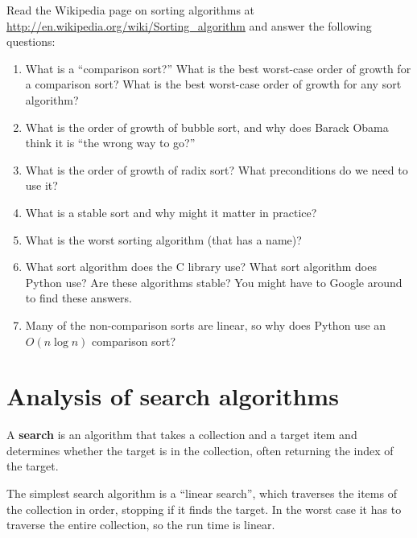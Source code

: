 \documentclass[10pt]{book}
\begin{document}
\begin{exercise}

Read the Wikipedia page on sorting algorithms at
\url{http://en.wikipedia.org/wiki/Sorting_algorithm} and answer
the following questions:

\begin{enumerate}

\item What is a ``comparison sort?'' What is the best worst-case order
  of growth for a comparison sort?  What is the best worst-case order
  of growth for any sort algorithm?

\item What is the order of growth of bubble sort, and why does Barack
  Obama think it is ``the wrong way to go?''

\item What is the order of growth of radix sort?  What preconditions
  do we need to use it?

\item What is a stable sort and why might it matter in practice?

\item What is the worst sorting algorithm (that has a name)?

\item What sort algorithm does the C library use?  What sort algorithm
  does Python use?  Are these algorithms stable?  You might have to
  Google around to find these answers.

\item Many of the non-comparison sorts are linear, so why does
  Python use an $O(n \log n)$ comparison sort?

\end{enumerate}

\end{exercise}


\section{Analysis of search algorithms}

A {\bf search} is an algorithm that takes a collection and a target
item and determines whether the target is in the collection, often
returning the index of the target.

The simplest search algorithm is a ``linear search'', which traverses
the items of the collection in order, stopping if it finds the target.
In the worst case it has to traverse the entire collection, so the run
time is linear.
\end{document}
